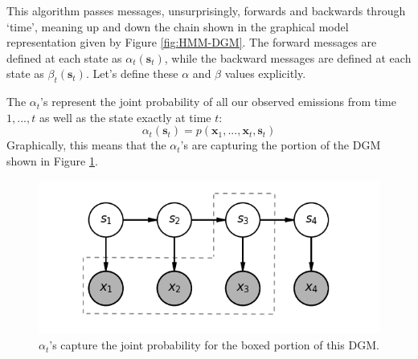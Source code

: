 This algorithm passes messages, unsurprisingly, forwards and backwards through `time', meaning up and down the chain shown in the graphical model representation given by Figure \ref{fig:HMM-DGM}. The forward messages are defined at each state as $\alpha_t(\textbf{s}_t)$, while the backward messages are defined at each state as $\beta_t(\textbf{s}_t)$. Let's define these $\alpha$ and $\beta$ values explicitly.

The $\alpha_t$'s represent the joint probability of all our observed emissions from time $1,...,t$ as well as the state exactly at time $t$:
\begin{equation} \label{unfactorized-alphas}
	\alpha_t(\textbf{s}_t) = p(\textbf{x}_1, ..., \textbf{x}_t, \textbf{s}_t)
\end{equation}
Graphically, this means that the $\alpha_t$'s are capturing the portion of the DGM shown in Figure \ref{fig:HMM-DGM-alpha}.
\begin{figure}
    \centering
    \includegraphics[width=0.5\paperwidth]{../HiddenMarkovModels/fig/HMM_DGM_alpha.png}
    \caption{$\alpha_t$'s capture the joint probability for the boxed portion of this DGM.}
    \label{fig:HMM-DGM-alpha}
\end{figure}

